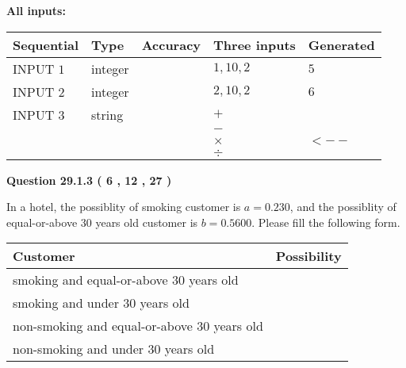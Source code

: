 \documentclass[12pt]{article}
\begin{document}
   
   
   
\noindent\vspace{0.1in}\hspace{-0.08in} {\textbf{\Large{All inputs: }}}
   
   
  
  
\noindent\begin{tabular}{|l|l|l|l|l|}
\hline
 Sequential & Type & Accuracy & Three inputs & Generated \\ 
\hline
 
 
  INPUT $            1 $ & integer &  & $
 1
 , 
 10
 , 
 2
 $ & $ 5 $ 
 \\  \hline  
 
 
  INPUT $            2 $ & integer &  & $
 2
 , 
 10
 , 
 2
 $ & $ 6 $ 
 \\  \hline  
 
 
  INPUT $            3 $ & string & & 
 $+$ & 
  \\
  & & & 
 $-$ & 
  \\
  & & & 
 $\times$ & 
  $ <-- $ 
  \\
  & & & 
 $\div$ & 
 \\  \hline  
 \end{tabular}
   
   
  
\vspace{0.2in}
  
{\textbf{\Large{Question
29.1.3 
 (           6 ,          12 ,          27 )
}}}
  
  
In a hotel, the possiblity of  %
smoking customer is
$a =  %
0.230$, and the possiblity of  %
equal-or-above 30 years old customer is $ b =  %
0.5600$.
Please fill the following form.
 
\noindent
\begin{tabular}{|l|l|}
\hline
Customer & Possibility \\
\hline
smoking  and   %
equal-or-above 30 years old  & \\
\hline
smoking  and   %
under 30 years old & \\
\hline
 non-smoking and   %
equal-or-above 30 years old  & \\
\hline
 non-smoking and  %
under 30 years old & \\
\hline
\end{tabular}
 
 
 
 
 
\noindent{}
 
\end{document}
